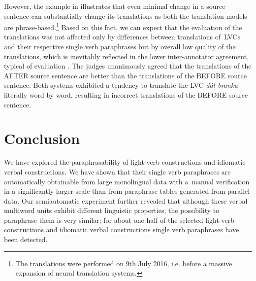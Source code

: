 \documentclass[output=paper,modfonts,nonflat]{langsci/langscibook}
\begin{document}
However, the example in  illustrates that even minimal change in 
a source sentence can substantially change its translations as both the 
translation models are phrase-based.\footnote{The translations were 
performed on 9th July 2016, i.e. before a massive expansion of neural 
translation systems.} Based on this fact, we can expect that the evaluation of 
the translations was not affected only by differences between translations 
of~LVCs and their respective single verb paraphrases but by overall low quality 
of the translations, which is inevitably reflected in the lower inter-annotator 
agreement, typical of  evaluation \citep{wmt13}. 
The judges unanimously agreed that the translations of the AFTER source sentence are better than the translations of the BEFORE source sentence. Both systems exhibited a tendency to translate the LVC \textit{dát branku} literally word by word, resulting in incorrect translations of the BEFORE source sentence.


\section{Conclusion}
We have explored the paraphrasability of   light-verb constructions and 
idiomatic verbal constructions. We have shown that their single verb 
paraphrases are automatically obtainable from large monolingual data with 
a~manual verification in a significantly larger scale than from paraphrase 
tables generated from parallel data. Our 
semiautomatic experiment further revealed that although these verbal multiword 
units exhibit different linguistic properties, the possibility to paraphrase
them is very similar; for about one half of the selected light-verb constructions 
and idiomatic verbal constructions single verb paraphrases have been detected.
\end{document}
